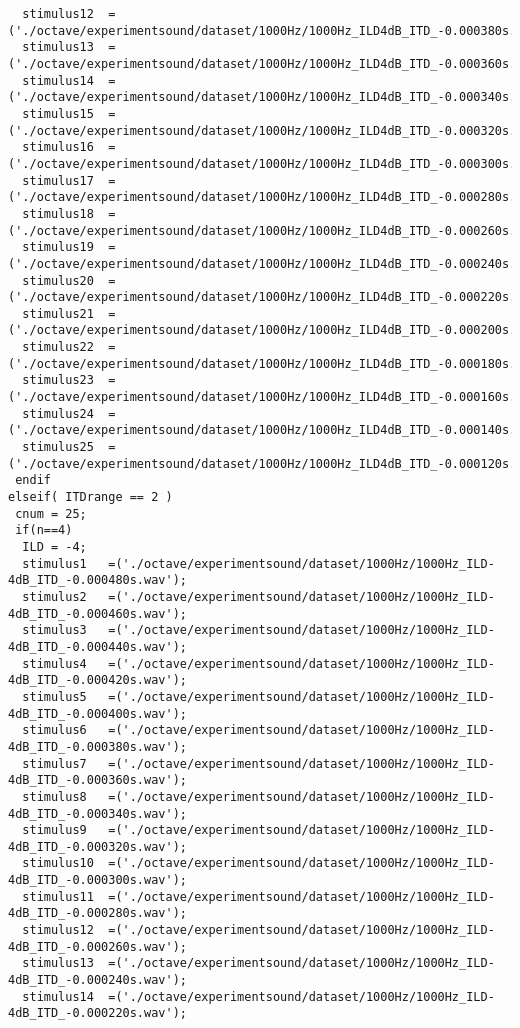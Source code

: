 {\begin{verbatim}
  stimulus12  =('./octave/experimentsound/dataset/1000Hz/1000Hz_ILD4dB_ITD_-0.000380s.wav');
  stimulus13  =('./octave/experimentsound/dataset/1000Hz/1000Hz_ILD4dB_ITD_-0.000360s.wav');
  stimulus14  =('./octave/experimentsound/dataset/1000Hz/1000Hz_ILD4dB_ITD_-0.000340s.wav');
  stimulus15  =('./octave/experimentsound/dataset/1000Hz/1000Hz_ILD4dB_ITD_-0.000320s.wav');
  stimulus16  =('./octave/experimentsound/dataset/1000Hz/1000Hz_ILD4dB_ITD_-0.000300s.wav');
  stimulus17  =('./octave/experimentsound/dataset/1000Hz/1000Hz_ILD4dB_ITD_-0.000280s.wav');
  stimulus18  =('./octave/experimentsound/dataset/1000Hz/1000Hz_ILD4dB_ITD_-0.000260s.wav');
  stimulus19  =('./octave/experimentsound/dataset/1000Hz/1000Hz_ILD4dB_ITD_-0.000240s.wav');
  stimulus20  =('./octave/experimentsound/dataset/1000Hz/1000Hz_ILD4dB_ITD_-0.000220s.wav');
  stimulus21  =('./octave/experimentsound/dataset/1000Hz/1000Hz_ILD4dB_ITD_-0.000200s.wav');
  stimulus22  =('./octave/experimentsound/dataset/1000Hz/1000Hz_ILD4dB_ITD_-0.000180s.wav');
  stimulus23  =('./octave/experimentsound/dataset/1000Hz/1000Hz_ILD4dB_ITD_-0.000160s.wav');
  stimulus24  =('./octave/experimentsound/dataset/1000Hz/1000Hz_ILD4dB_ITD_-0.000140s.wav');
  stimulus25  =('./octave/experimentsound/dataset/1000Hz/1000Hz_ILD4dB_ITD_-0.000120s.wav');
 endif
elseif( ITDrange == 2 )
 cnum = 25;
 if(n==4)
  ILD = -4;
  stimulus1   =('./octave/experimentsound/dataset/1000Hz/1000Hz_ILD-4dB_ITD_-0.000480s.wav');
  stimulus2   =('./octave/experimentsound/dataset/1000Hz/1000Hz_ILD-4dB_ITD_-0.000460s.wav');
  stimulus3   =('./octave/experimentsound/dataset/1000Hz/1000Hz_ILD-4dB_ITD_-0.000440s.wav');
  stimulus4   =('./octave/experimentsound/dataset/1000Hz/1000Hz_ILD-4dB_ITD_-0.000420s.wav');
  stimulus5   =('./octave/experimentsound/dataset/1000Hz/1000Hz_ILD-4dB_ITD_-0.000400s.wav');
  stimulus6   =('./octave/experimentsound/dataset/1000Hz/1000Hz_ILD-4dB_ITD_-0.000380s.wav');
  stimulus7   =('./octave/experimentsound/dataset/1000Hz/1000Hz_ILD-4dB_ITD_-0.000360s.wav');
  stimulus8   =('./octave/experimentsound/dataset/1000Hz/1000Hz_ILD-4dB_ITD_-0.000340s.wav');
  stimulus9   =('./octave/experimentsound/dataset/1000Hz/1000Hz_ILD-4dB_ITD_-0.000320s.wav');
  stimulus10  =('./octave/experimentsound/dataset/1000Hz/1000Hz_ILD-4dB_ITD_-0.000300s.wav');
  stimulus11  =('./octave/experimentsound/dataset/1000Hz/1000Hz_ILD-4dB_ITD_-0.000280s.wav');
  stimulus12  =('./octave/experimentsound/dataset/1000Hz/1000Hz_ILD-4dB_ITD_-0.000260s.wav');
  stimulus13  =('./octave/experimentsound/dataset/1000Hz/1000Hz_ILD-4dB_ITD_-0.000240s.wav');
  stimulus14  =('./octave/experimentsound/dataset/1000Hz/1000Hz_ILD-4dB_ITD_-0.000220s.wav');

\end{verbatim}}
